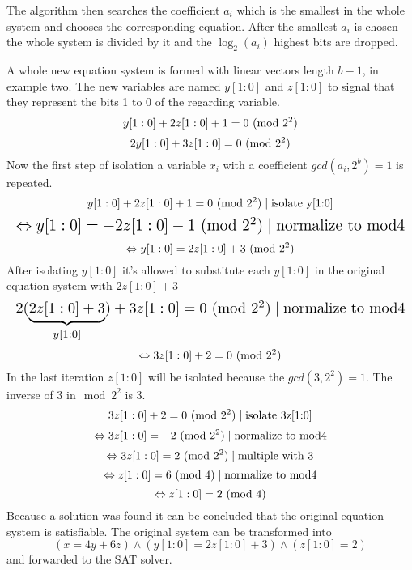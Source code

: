 The algorithm then searches the coefficient $a_i$ which is the smallest in the whole system and chooses the corresponding equation.
After the smallest $a_i$ is chosen the whole system is divided by it and the $\log_{2}(a_i)$ highest bits are dropped.

A whole new equation system is formed with linear vectors length $b-1$, in example two.
The new variables are named $y[1:0]$ and $z[1:0]$ to signal that they represent the bits 1 to 0 of the regarding variable.
$$y[1 : 0] + 2z[1 : 0] + 1 = 0 \ (\mathrm{mod}\ 2^2)$$
$$2y[1 : 0] + 3z[1 : 0] = 0\ (\mathrm{mod}\ 2^2)$$
Now the first step of isolation a variable $x_i$ with a coefficient $gcd(a_i, 2^b)=1$ is repeated.
$$y[1 : 0] + 2z[1 : 0] + 1 = 0 \ (\mathrm{mod}\ 2^2)\mid \text{isolate y[1:0]}$$
\[\resizebox{\columnwidth}{!}{$\displaystyle
$$\Leftrightarrow y[1 : 0] = -2z[1 : 0] -1 \Mod{2^2} \mid \text{normalize to mod4}$$
$}\]
$$\Leftrightarrow y[1 : 0] = 2z[1 : 0] +3 \ (\mathrm{mod}\ 2^2)$$
After isolating $y[1 : 0] $ it's allowed to substitute each $y[1 : 0] $ in the original equation system with $2z[1:0]+3$
\[\resizebox{\columnwidth}{!}{$\displaystyle
$$2(\underbrace{2z[1:0]+3}_{y[1:0]}) + 3z[1 : 0] = 0\Mod{2^2} \mid \text{normalize to mod4}$$
$}\]
$$\Leftrightarrow 3z[1:0] + 2 = 0 \ (\mathrm{mod}\ 2^2)$$
In the last iteration $z[1:0]$ will be isolated because the $gcd(3,2^2) = 1$. The inverse of 3 in$\mod{2^2}$ is 3.
$$3z[1:0] + 2 = 0 \ (\mathrm{mod}\ 2^2) \mid \text{isolate 3z[1:0]}$$
$$\Leftrightarrow 3z[1:0]=-2  \ (\mathrm{mod}\ 2^2)   \mid \text{normalize to mod4}$$
$$\Leftrightarrow 3z[1:0]=2  \ (\mathrm{mod}\ 2^2)   \mid \text{multiple with 3}$$
$$\Leftrightarrow z[1:0]=6  \ (\mathrm{mod}\ 4)  \mid \text{normalize to mod4}$$
$$\Leftrightarrow z[1:0]=2  \ (\mathrm{mod}\ 4)$$
Because a solution was found it can be concluded that the original equation system is satisfiable.
The original system can be transformed into $$(x = 4y + 6z) \land (y[1 : 0] = 2z[1 : 0] + 3) \land (z[1 : 0] = 2)$$ and forwarded to the SAT solver.
